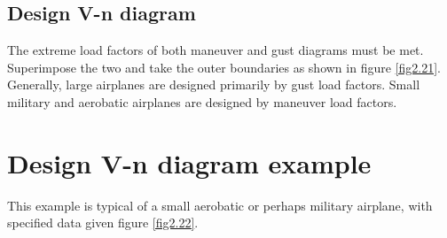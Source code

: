 \documentclass{AeroStructure-ERJohnson}
\begin{document}
\subsection{Design V-n diagram}\label{sec2.5.4}

The extreme load factors of both maneuver and gust diagrams must be met. Superimpose the two and take the outer boundaries as shown in figure \ref{fig2.21}. Generally, large airplanes are designed primarily by gust load factors. Small military and aerobatic airplanes are designed by maneuver load factors.

{\def\thefigure{2.21}
}


\section{Design V-n diagram example}\label{sec2.6}

This example is typical of a small aerobatic or perhaps military airplane, with specified data given figure \ref{fig2.22}.

{\def\thefigure{2.22}
}

\clearpage
\end{document}
